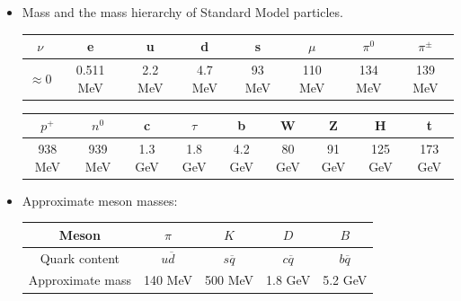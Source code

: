 \documentclass[11pt, oneside]{article}   	%
\theoremstyle{definition}
\numberwithin{equation}{subsection}		%
\begin{document}
\begin{itemize}
	
	\item Mass and the mass hierarchy of Standard Model particles. 
	\begin{table}[H]
	\centering
	\begin{tabular}{ | c | c | c | c | c | c | c | c | }
		\hline
		$\nu$ & e & u & d & s & $\mu$ & $\pi^0$ & $\pi^\pm$ \\
		\hline
		$\approx 0$ & 0.511 MeV & 2.2 MeV & 4.7 MeV & 93 MeV & 110 MeV & 134 MeV & 139 MeV \\
		\hline
		\end{tabular}
		\begin{tabular}{ | c | c | c | c | c | c | c | c | c | }
		\hline
		$p^+$ & $n^0$ & c & $\tau$ & b & W & Z & H & t \\
		\hline
		938 MeV & 939 MeV & 1.3 GeV & 1.8 GeV & 4.2 GeV & 80 GeV & 91 GeV & 125 GeV & 173 GeV \\
		\hline
	\end{tabular}
	\end{table}
	
	\item Approximate meson masses:
	\begin{table}[H]
	\centering
	\begin{tabular}{ | c | c | c | c | c | }
		\hline
		Meson & $\pi$ & $K$ & $D$ & $B$ \\
		\hline
		Quark content & $u\overline d$ & $s\overline q$ & $c\overline q$ & $b\overline q$ \\
		\hline
		Approximate mass & 140 MeV & 500 MeV & 1.8 GeV & 5.2 GeV \\
		\hline
		\end{tabular}
	\end{table}
	

\end{itemize}
\end{document}
